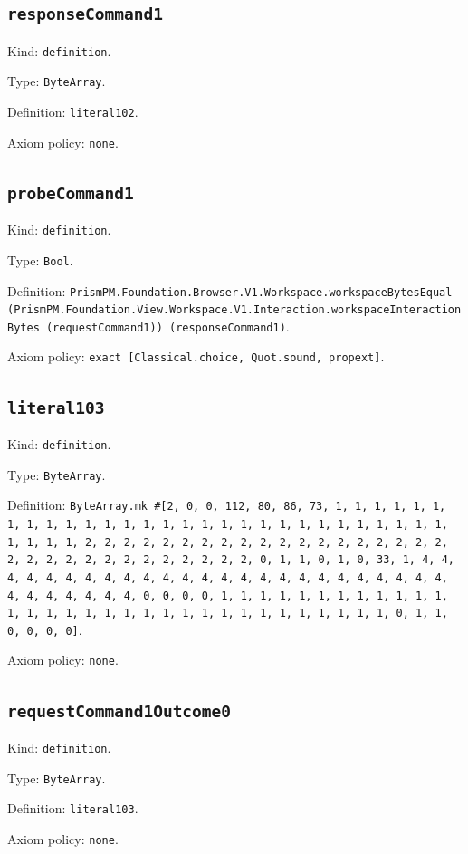 \documentclass[11pt]{article}
\begin{document}
\subsection*{\texttt{responseCommand1}}
\noindent Kind: \texttt{definition}.\par
\noindent Type: \texttt{ByteArray}.\par
\noindent Definition: \texttt{literal102}.\par
\noindent Axiom policy: \texttt{none}.\par
\subsection*{\texttt{probeCommand1}}
\noindent Kind: \texttt{definition}.\par
\noindent Type: \texttt{Bool}.\par
\noindent Definition: \texttt{PrismPM.Foundation.Browser.V1.Workspace.workspaceBytesEqual (PrismPM.Foundation.View.Workspace.V1.Interaction.workspaceInteractionBytes (requestCommand1)) (responseCommand1)}.\par
\noindent Axiom policy: \texttt{exact [Classical.choice, Quot.sound, propext]}.\par
\subsection*{\texttt{literal103}}
\noindent Kind: \texttt{definition}.\par
\noindent Type: \texttt{ByteArray}.\par
\noindent Definition: \texttt{ByteArray.mk \#[2, 0, 0, 112, 80, 86, 73, 1, 1, 1, 1, 1, 1, 1, 1, 1, 1, 1, 1, 1, 1, 1, 1, 1, 1, 1, 1, 1, 1, 1, 1, 1, 1, 1, 1, 1, 1, 1, 1, 1, 2, 2, 2, 2, 2, 2, 2, 2, 2, 2, 2, 2, 2, 2, 2, 2, 2, 2, 2, 2, 2, 2, 2, 2, 2, 2, 2, 2, 2, 2, 2, 2, 0, 1, 1, 0, 1, 0, 33, 1, 4, 4, 4, 4, 4, 4, 4, 4, 4, 4, 4, 4, 4, 4, 4, 4, 4, 4, 4, 4, 4, 4, 4, 4, 4, 4, 4, 4, 4, 4, 4, 4, 0, 0, 0, 0, 1, 1, 1, 1, 1, 1, 1, 1, 1, 1, 1, 1, 1, 1, 1, 1, 1, 1, 1, 1, 1, 1, 1, 1, 1, 1, 1, 1, 1, 1, 1, 1, 0, 1, 1, 0, 0, 0, 0]}.\par
\noindent Axiom policy: \texttt{none}.\par
\subsection*{\texttt{requestCommand1Outcome0}}
\noindent Kind: \texttt{definition}.\par
\noindent Type: \texttt{ByteArray}.\par
\noindent Definition: \texttt{literal103}.\par
\noindent Axiom policy: \texttt{none}.\par
\end{document}
